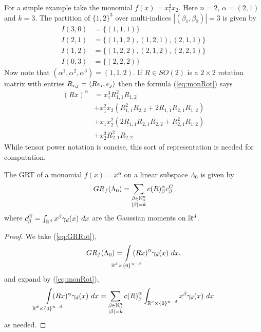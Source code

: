 \begin{myexample}
  For a simple example take the monomial $f(x) = x_1^2x_2$. Here $n = 2$, $\alpha = (2, 1)$ and $k = 3$. The partition of ${\{1, 2\}}^3$ over multi-indices $|(\beta_1, \beta_2)| = 3$ is given by
  \begin{align*}
    I(3,0) &= \{(1, 1, 1)\} \\
    I(2,1) &= \{(1, 1, 2), (1, 2, 1), (2, 1, 1)\} \\
    I(1,2) &= \{(1, 2, 2), (2, 1, 2), (2, 2, 1)\} \\
    I(0,3) &= \{(2, 2, 2)\}
  \end{align*}
  Now note that $(\alpha^1, \alpha^2, \alpha^3) = (1, 1, 2)$. If $R \in SO(2)$ is a $2 \times 2$ rotation matrix with entries $R_{i,j} = \left\langle Re_i, e_j \right\rangle$ then the formula (\ref{eq:monRot}) says 
  \begin{align*}
    (Rx)^\alpha 
    &= x_1^3 R_{1,1}^2 R_{1,2} \\
    &+ x_1^2x_2 \left(R_{1,1}^2R_{2,2} + 2R_{1,1}R_{2,1}R_{1,2}\right) \\
    &+ x_1x_2^2 \left(2R_{1,1}R_{2,1}R_{2,2} + R_{2,1}^2R_{1,2}\right) \\
    &+ x_2^3 R_{2,1}^2 R_{2,2}
  \end{align*}
  While tensor power notation is concise, this sort of representation is needed for computation.
\end{myexample}

\begin{proposition}
  The GRT of a monomial $f(x) = x^\alpha$ on a linear subspace $\Lambda_0$ is given by
  \[
    GR_f(\Lambda_0) = \sum_{\substack{\beta \in \mathbb{N}_0^n \\ |\beta| = k}} c(R)^\alpha_\beta c^G_{\beta}
  \]
  where $c^G_\beta = \int_{\mathbb{R}^d} x^\beta \gamma_d(x) ~dx$ are the Gaussian moments on $\mathbb{R}^d$.
\end{proposition}

\begin{proof}
  We take (\ref{eq:GRRot}),
  \[
    GR_f(\Lambda_0) = \int\mclimits_{\RR^d \times {\{0\}}^{n-d}} {(Rx)}^\alpha \gamma_d(x) ~dx,
  \]
  and expand by (\ref{eq:monRot}),
  \begin{align*}
    \int\mclimits_{\RR^d \times {\{0\}}^{n-d}} (Rx)^\alpha \gamma_d(x) ~dx
    &= \sum_{\substack{\beta \in \NN_0^n \\ |\beta| = k}} {c(R)}^\alpha_\beta \int_{\RR^d \times {\{0\}}^{n-d}} x^\beta \gamma_d(x) ~dx
  \end{align*}
  as needed.
\end{proof}

